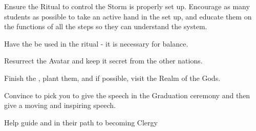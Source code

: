 \documentclass[char]{GL2020}
\begin{document}






\begin{itemz}[Goals]
	\item Ensure the Ritual to control the Storm is properly set up. Encourage as many students as possible to take an active hand in the set up, and educate them on the functions of all the steps so they can understand the system.
	\item Have the \iNet{} be used in the ritual - it is necessary for balance.
	\item Resurrect the \cEbb{} Avatar and keep it secret from the other nations.
	\item Finish the \iMagicBeans{}, plant them, and if possible, visit the Realm of the Gods.
\item Convince \cMusic{} to pick you to give the speech in the Graduation ceremony and then give a moving and inspiring speech.
\item Help guide \cInitiate{} and \cWarlordDaughter{} in their path to becoming Clergy
\end{itemz}
\end{document}
